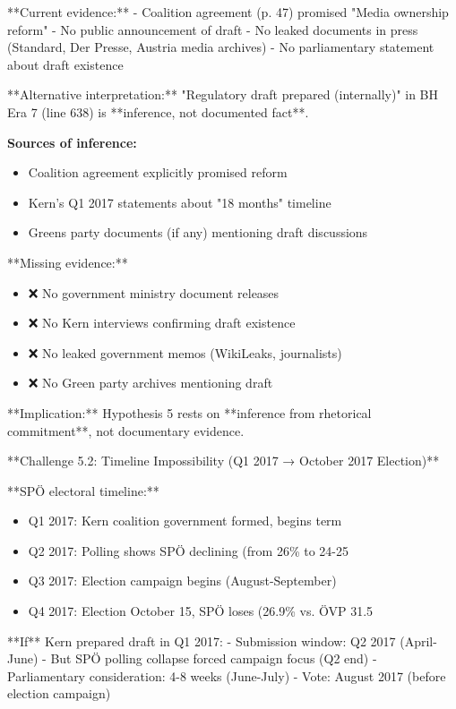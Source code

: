 **Current evidence:**
- Coalition agreement (p. 47) promised "Media ownership reform"
- No public announcement of draft
- No leaked documents in press (Standard, Der Presse, Austria media archives)
- No parliamentary statement about draft existence

**Alternative interpretation:** "Regulatory draft prepared (internally)" in BH Era 7 (line 638) is **inference, not documented fact**.

\textbf{Sources of inference:}
\begin{itemize}
\item Coalition agreement explicitly promised reform
\item Kern's Q1 2017 statements about "18 months" timeline
\item Greens party documents (if any) mentioning draft discussions
\end{itemize}

**Missing evidence:**
\begin{itemize}
\item ❌ No government ministry document releases
\item ❌ No Kern interviews confirming draft existence
\item ❌ No leaked government memos (WikiLeaks, journalists)
\item ❌ No Green party archives mentioning draft
\end{itemize}

**Implication:** Hypothesis 5 rests on **inference from rhetorical commitment**, not documentary evidence.

**Challenge 5.2: Timeline Impossibility (Q1 2017 → October 2017 Election)**

**SPÖ electoral timeline:**
\begin{itemize}
\item Q1 2017: Kern coalition government formed, begins term
\item Q2 2017: Polling shows SPÖ declining (from 26\% to 24-25%
\item Q3 2017: Election campaign begins (August-September)
\item Q4 2017: Election October 15, SPÖ loses (26.9\% vs. ÖVP 31.5%
\end{itemize}

**If** Kern prepared draft in Q1 2017:
- Submission window: Q2 2017 (April-June)
- But SPÖ polling collapse forced campaign focus (Q2 end)
- Parliamentary consideration: 4-8 weeks (June-July)
- Vote: August 2017 (before election campaign)

